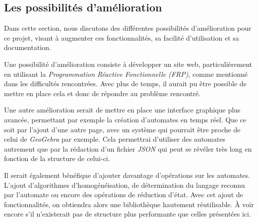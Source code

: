 

\subsection{Les possibilités d'amélioration}

Dans cette section, nous discutons des différentes possibilités d'amélioration 
pour ce projet, visant à augmenter ces fonctionnalités, sa facilité 
d'utilisation et sa documentation.

Une possibilité d'amélioration consiste à développer un site web, 
particulièrement en utilisant la \textit{Programmation Réactive Fonctionnelle 
(FRP)}, comme mentionné dans les difficultés rencontrées. Avec plus de temps, il
aurait pu être possible de mettre en place cela et donc de répondre au problème 
rencontré.

\vphantom{}

Une autre amélioration serait de mettre en place une interface graphique plus 
avancée, permettant par exemple la création d'automates en temps réel. Que ce 
soit par l'ajout d'une autre page, avec un système qui pourrait être proche de 
celui de \textit{GeoGebra} par exemple. Cela permettrai d'utiliser des automates 
autrement que par la rédaction d'un fichier \textit{JSON} qui peut se révéler 
très long en fonction de la structure de celui-ci.   

\phantom{}

Il serait également bénéfique d'ajouter davantage d'opérations sur les 
automates. L'ajout d'algorithmes d'homogénéisation, de détermination du langage 
reconnu par l'automate ou encore des opérations de réduction d'état. Avec cet 
ajout de fonctionnalités, on obtiendra alors une bibliothèque hautement 
réutilisable. À voir encore s'il n'existerait pas de structure plus performante 
que celles présentées ici.

